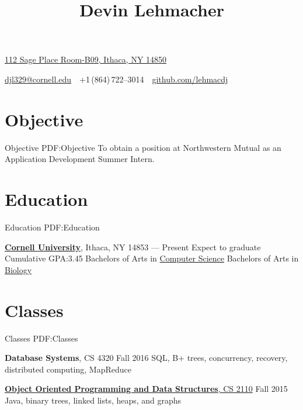 \documentclass[letterpaper,10pt,oneside]{simpleresume}
\newcommand{\CVAuthor}{Devin Lehmacher}
\newcommand{\CVCompany}{Northwestern Mutual}
\newcommand{\CVWebpage}{github.com/lehmacdj}
\begin{document}
\begin{minipage}[t][0pt]{\linewidth}
\pagestyle{empty}

\title{\CVAuthor}

\begin{subtitle}
\href{https://www.google.com/maps/place/112+Sage+Pl+Room-B09,+Ithaca,+NY+14850}
{112 Sage Place Room-B09, Ithaca, NY 14850}
\par
\href{mailto:djl329@cornell.edu}
{djl329@cornell.edu}
\,\SubBulletSymbol\,
+1\,(864)\,722--3014
\,\SubBulletSymbol\,
\href{https://\CVWebpage}
{\CVWebpage}
\end{subtitle}

\begin{body}

\section%
{Objective}
{Objective}
{PDF:Objective}
To obtain a position at \CVCompany{} as an Application Development Summer
Intern.

\section%
{Education}
{Education}
{PDF:Education}

\href{https://www.cornell.edu}
{\textbf{Cornell University}},
Ithaca, NY 14853
\hfill
{} --- Present
\BulletItem%
Expect to graduate 
\BulletItem%
Cumulative GPA:\@ 3.45
\BulletItem%
Bachelors of Arts in
\href{https://www.cs.cornell.edu}{Computer Science}
\BulletItem%
Bachelors of Arts in
\href{https://www.biology.cornell.edu}{Biology}

\section%
{Classes}
{Classes}
{PDF:Classes}

\textbf{Database Systems}, CS 4320
\hfill Fall 2016
\BulletItem%
SQL, B+ trees, concurrency, recovery, distributed computing, MapReduce

\href{https://www.cs.cornell.edu/courses/cs2110/2015fa/}
{\textbf{Object Oriented Programming and Data Structures}, CS 2110}
\hfill Fall 2015
\BulletItem%
Java, binary trees, linked lists, heaps, and graphs


\end{body}
\end{minipage}
\end{document}

